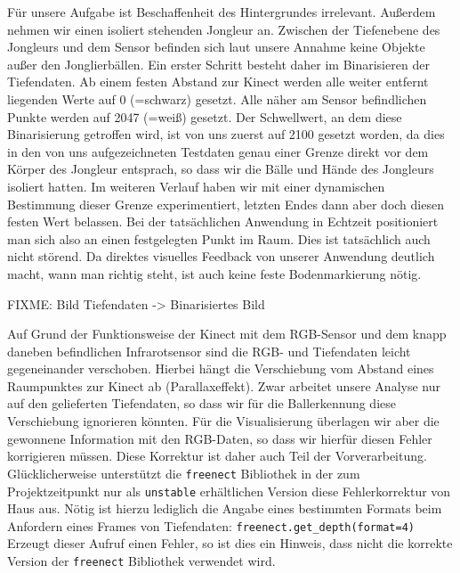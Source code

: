 \documentclass[12pt,a4paper,ngerman]{scrartcl}
\begin{document}
Für unsere Aufgabe ist Beschaffenheit des Hintergrundes irrelevant. Außerdem nehmen
wir einen isoliert stehenden Jongleur an. Zwischen der Tiefenebene des Jongleurs
und dem Sensor befinden sich laut unsere Annahme keine Objekte außer den
Jonglierbällen. Ein erster Schritt besteht daher im Binarisieren der Tiefendaten.
Ab einem festen Abstand zur Kinect werden alle weiter entfernt liegenden Werte auf 0
(=schwarz) gesetzt. Alle näher am Sensor befindlichen Punkte werden auf 2047 (=weiß)
gesetzt. Der Schwellwert, an dem diese Binarisierung getroffen wird, ist von uns
zuerst auf 2100 gesetzt worden, da dies in den von uns aufgezeichneten Testdaten
genau einer Grenze direkt vor dem Körper des Jongleur entsprach, so dass wir
die Bälle und Hände des Jongleurs isoliert hatten. Im weiteren Verlauf haben wir mit
einer dynamischen Bestimmung dieser Grenze experimentiert, letzten Endes dann aber
doch diesen festen Wert belassen. Bei der tatsächlichen Anwendung in Echtzeit
positioniert man sich also an einen festgelegten Punkt im Raum. Dies ist tatsächlich
auch nicht störend. Da direktes visuelles Feedback von unserer Anwendung deutlich
macht, wann man richtig steht, ist auch keine feste Bodenmarkierung nötig.

{\color{red}FIXME: Bild Tiefendaten -> Binarisiertes Bild}

Auf Grund der Funktionsweise der Kinect mit dem RGB-Sensor und dem knapp daneben
befindlichen Infrarotsensor sind die RGB- und Tiefendaten leicht gegeneinander
verschoben. Hierbei hängt die Verschiebung vom Abstand eines Raumpunktes zur Kinect
ab (Parallaxeffekt). Zwar arbeitet unsere Analyse nur auf den gelieferten
Tiefendaten, so dass wir für die Ballerkennung diese Verschiebung ignorieren
könnten. Für die Visualisierung überlagen wir aber die gewonnene Information mit
den RGB-Daten, so dass wir hierfür diesen Fehler korrigieren müssen. Diese
Korrektur ist daher auch Teil der Vorverarbeitung. Glücklicherweise unterstützt
die \lstinline{freenect} Bibliothek in der zum Projektzeitpunkt nur als
\lstinline{unstable} erhältlichen Version diese Fehlerkorrektur von Haus aus. Nötig
ist hierzu lediglich die Angabe eines bestimmten Formats beim Anfordern eines
Frames von Tiefendaten: \lstinline{freenect.get_depth(format=4)}
Erzeugt dieser Aufruf einen Fehler, so ist dies ein Hinweis, dass nicht die korrekte
Version der \lstinline{freenect} Bibliothek verwendet wird.
\end{document}
